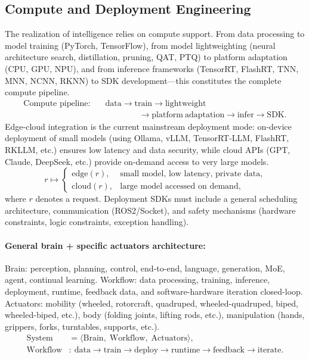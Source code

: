 \documentclass[12pt,a4paper]{article}
\begin{document}
\subsection{Compute and Deployment Engineering}
The realization of intelligence relies on compute support. From data processing to model training (PyTorch, TensorFlow), from model lightweighting (neural architecture search, distillation, pruning, QAT, PTQ) to platform adaptation (CPU, GPU, NPU), and from inference frameworks (TensorRT, FlashRT, TNN, MNN, NCNN, RKNN) to SDK development---this constitutes the complete compute pipeline.
\begin{equation}
\begin{split}
\text{Compute pipeline}:\quad
&\mathrm{data}\to\mathrm{train}\to\mathrm{lightweight}\\
&\qquad\qquad\to\mathrm{platform\ adaptation}\to\mathrm{infer}\to\mathrm{SDK}.
\end{split}
\label{eq:compute-pipeline}
\end{equation}
Edge-cloud integration is the current mainstream deployment mode: on-device deployment of small models (using Ollama, vLLM, TensorRT-LLM, FlashRT, RKLLM, etc.) ensures low latency and data security, while cloud APIs (GPT, Claude, DeepSeek, etc.) provide on-demand access to very large models.
\begin{equation}
r\mapsto\begin{cases}
\mathrm{edge}(r), & \text{small model, low latency, private data},\\[2pt]
\mathrm{cloud}(r), & \text{large model accessed on demand},
\end{cases}
\label{eq:edge-cloud}
\end{equation}
where $r$ denotes a request. Deployment SDKs must include a general scheduling architecture, communication (ROS2/Socket), and safety mechanisms (hardware constraints, logic constraints, exception handling).

\paragraph*{General brain + specific actuators architecture:}
Brain: perception, planning, control, end-to-end, language, generation, MoE, agent, continual learning.
Workflow: data processing, training, inference, deployment, runtime, feedback data, and software-hardware iteration closed-loop.
Actuators: mobility (wheeled, rotorcraft, quadruped, wheeled-quadruped, biped, wheeled-biped, etc.), body (folding joints, lifting rods, etc.), manipulation (hands, grippers, forks, turntables, supports, etc.).
\begin{equation}
\begin{split}
\mathrm{System}&=\bigl\langle \mathrm{Brain},\;\mathrm{Workflow},\;\mathrm{Actuators}\bigr\rangle,\\
\mathrm{Workflow}&:\ \mathrm{data}\to\mathrm{train}\to\mathrm{deploy}\to\mathrm{runtime}\to\mathrm{feedback}\to\mathrm{iterate}.
\end{split}
\label{eq:brain-actuator}
\end{equation}
\end{document}
